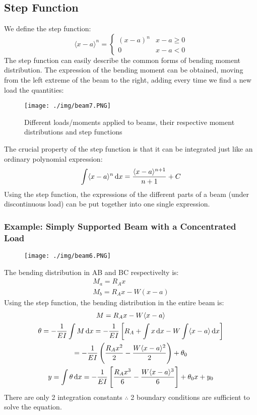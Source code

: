 \subsection{Step Function}
We define the step function:
\[
  \langle x-a \rangle^n =
  \begin{cases}
    (x-a)^n & x-a\geq 0 \\
    0       & x-a<0
  \end{cases}
\]
The step function can easily describe the common forms of bending moment distribution. The expression of the bending moment can be obtained, moving from the left extreme of the beam to the right, adding every time we find a new load the quantities:
\begin{figure}[H]
  \centering
  \texttt{[image: ./img/beam7.PNG]}
  \caption{Different loads/moments applied to beams, their respective moment distributions and step functions}
\end{figure}
The crucial property of the step function is that it can be integrated just like an ordinary polynomial expression:
\begin{gather}
  \int \langle x-a \rangle^n \dif x = \frac{\langle x-a \rangle^{n+1}}{n+1} + C
\end{gather}
Using the step function, the expressions of the different parts of a beam (under discontinuous load) can be put together into one single expression.
\subsubsection{Example: Simply Supported Beam with a Concentrated Load}
\begin{figure}[H]
  \centering
  \texttt{[image: ./img/beam6.PNG]}
\end{figure}
The bending distribution in AB and BC respectivelty is:
\begin{gather}
  M_a = R_Ax \\
  M_b = R_Ax - W(x-a)
\end{gather}
Using the step function, the bending distribution in the entire beam is:
\begin{gather}
  M = R_Ax - W\langle x-a \rangle \\
  \theta = -\frac{1}{EI}\int M \dif x = -\frac{1}{EI}\left[R_A+\int x \dif x - W\int \langle x-a \rangle \dif x \right] \\
  = -\frac{1}{EI}\left(\frac{R_Ax^2}{2}-\frac{W\langle x-a \rangle^2}{2}\right) + \theta_0 \\
  y = \int \theta \dif x = -\frac{1}{EI}\left[\frac{R_Ax^3}{6}-\frac{W\langle x-a \rangle^3}{6}\right] + \theta_0x + y_0
\end{gather}
There are only 2 integration constants $\therefore$ 2 boundary conditions are sufficient to solve the equation.
